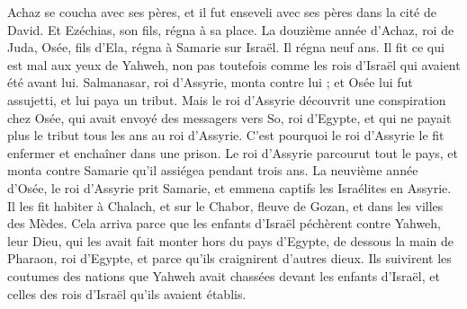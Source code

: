 \begin{multicols}{2}
Achaz se coucha avec ses pères, et il fut enseveli avec ses pères dans la cité de David. Et Ezéchias, son fils, régna à sa place.
\VerseOne{}La douzième année d’Achaz, roi de Juda, Osée, fils d’Ela, régna à Samarie sur Israël. Il régna neuf ans.
Il fit ce qui est mal aux yeux de Yahweh, non pas toutefois comme les rois d’Israël qui avaient été avant lui.
Salmanasar, roi d’Assyrie, monta contre lui ; et Osée lui fut assujetti, et lui paya un tribut.
Mais le roi d’Assyrie découvrit une conspiration chez Osée, qui avait envoyé des messagers vers So, roi d’Egypte, et qui ne payait plus le tribut tous les ans au roi d’Assyrie. C’est pourquoi le roi d’Assyrie le fit enfermer et enchaîner dans une prison.
Le roi d’Assyrie parcourut tout le pays, et monta contre Samarie qu’il assiégea pendant trois ans.
La neuvième année d’Osée, le roi d’Assyrie prit Samarie, et emmena captifs les Israélites en Assyrie. Il les fit habiter à Chalach, et sur le Chabor, fleuve de Gozan, et dans les villes des Mèdes.
Cela arriva parce que les enfants d’Israël péchèrent contre Yahweh, leur Dieu, qui les avait fait monter hors du pays d’Egypte, de dessous la main de Pharaon, roi d’Egypte, et parce qu’ils craignirent d’autres dieux.
Ils suivirent les coutumes des nations que Yahweh avait chassées devant les enfants d’Israël, et celles des rois d’Israël qu’ils avaient établis.

\end{multicols}
